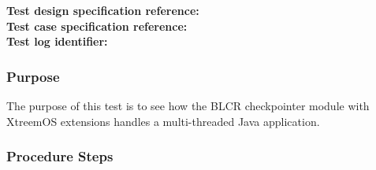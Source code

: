 



\noindent\textbf{Test design specification reference: } \\%
\noindent\textbf{Test case specification reference: }\\
\noindent\textbf{Test log identifier: } %




\subsubsection{Purpose}
The purpose of this test is to see how the BLCR checkpointer module with Xtreem\-OS extensions handles a multi-threaded Java application.

\subsubsection{Procedure Steps}


